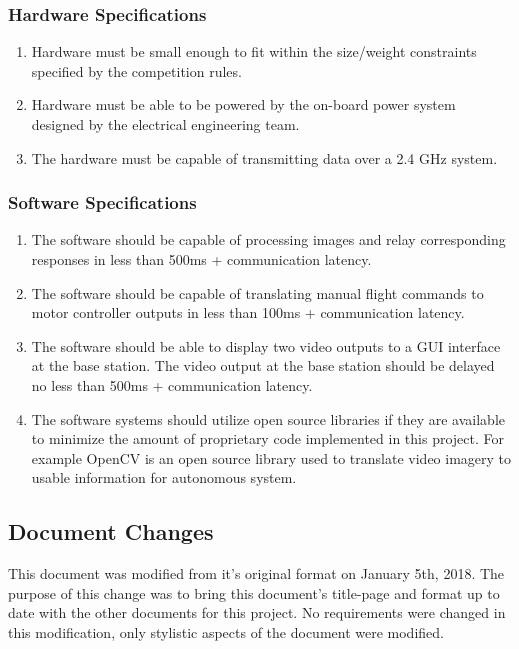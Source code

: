 \documentclass[onecolumn, draftclsnofoot,10pt, compsoc]{IEEEtran}
\begin{document}
\subsubsection{Hardware Specifications}
\begin{enumerate}
\item Hardware must be small enough to fit within the size/weight constraints specified by the competition rules\cite{r2}. 
\item Hardware must be able to be powered by the on-board power system designed by the electrical engineering team. 
\item The hardware must be capable of transmitting data over a 2.4 GHz system. 


\end{enumerate}
\subsubsection{Software Specifications}
\begin{enumerate}
\item The software should be capable of processing images and relay corresponding responses in less than 500ms + communication latency.

\item The software should be capable of translating manual flight commands to motor controller outputs in less than 100ms + communication latency.

\item The software should be able to display two video outputs to a GUI interface at the base station. The video output at the base station should be delayed no less than 500ms + communication latency. 

\item The software systems should utilize open source libraries if they are available to minimize the amount of proprietary code implemented in this project. For example OpenCV is an open source library used to translate video imagery to usable information for autonomous system.

\end{enumerate}


\subsection{Document Changes}

This document was modified from it's original format on January 5th, 2018. The purpose of this change was to bring this document's title-page and format up to date with the other documents for this project. No requirements were changed in this modification, only stylistic aspects of the document were modified.
\end{document}
